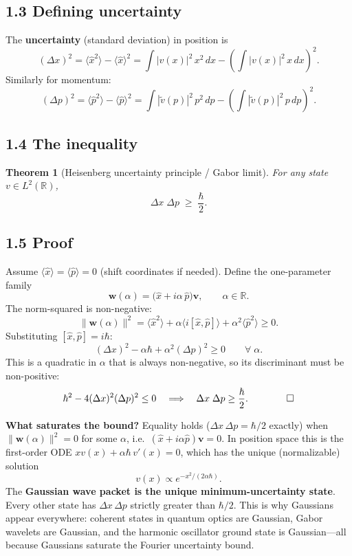 \documentclass[12pt,a4paper]{article}
\newtheorem{theorem}{Theorem}
\begin{document}
\subsection{1.3 Defining uncertainty}
The \textbf{uncertainty} (standard deviation) in position is
\[
    (\Delta x)^2 = \langle \hat{x}^2 \rangle - \langle \hat{x} \rangle^2 = \int |v(x)|^2\,x^2\,dx - \left(\int |v(x)|^2\,x\,dx\right)^2.
\]
Similarly for momentum:
\[
    (\Delta p)^2 = \langle \hat{p}^2 \rangle - \langle \hat{p} \rangle^2 = \int |\tilde{v}(p)|^2\,p^2\,dp - \left(\int |\tilde{v}(p)|^2\,p\,dp\right)^2.
\]

\subsection{1.4 The inequality}

\begin{theorem}[Heisenberg uncertainty principle / Gabor limit]
For any state $v \in L^2(\mathbb{R})$,
\[
    \boxed{\Delta x\;\Delta p \;\geq\; \frac{\hbar}{2}.}
\]
\end{theorem}

\subsection{1.5 Proof}
Assume $\langle \hat{x} \rangle = \langle \hat{p} \rangle = 0$ (shift coordinates if needed).  Define the one-parameter family
\[
    \mathbf{w}(\alpha) = \bigl(\hat{x} + i\alpha\,\hat{p}\bigr)\mathbf{v}, \qquad \alpha\in\mathbb{R}.
\]
The norm-squared is non-negative:
\[
    \|\mathbf{w}(\alpha)\|^2 = \langle \hat{x}^2 \rangle + \alpha\langle i[\hat{x},\hat{p}] \rangle + \alpha^2\langle \hat{p}^2 \rangle \geq 0.
\]
Substituting $[\hat{x},\hat{p}]=i\hbar$:
\[
    (\Delta x)^2 - \alpha\hbar + \alpha^2(\Delta p)^2 \geq 0 \qquad \forall\;\alpha.
\]
This is a quadratic in $\alpha$ that is always non-negative, so its discriminant must be non-positive:
\[
    \hbar^2 - 4(\Delta x)^2(\Delta p)^2 \leq 0 \quad\Longrightarrow\quad
    \Delta x\;\Delta p \geq \frac{\hbar}{2}.\qquad\qed
\]

\medskip
\noindent\textbf{What saturates the bound?}  Equality holds ($\Delta x\,\Delta p = \hbar/2$ exactly) when $\|\mathbf{w}(\alpha)\|^2 = 0$ for some $\alpha$, i.e.\ $(\hat{x}+i\alpha\hat{p})\mathbf{v}=0$.  In position space this is the first-order ODE $xv(x) + \alpha\hbar\,v'(x) = 0$, which has the unique (normalizable) solution
\[
    v(x) \propto e^{-x^2/(2\alpha\hbar)}.
\]
The \textbf{Gaussian wave packet is the unique minimum-uncertainty state}.  Every other state has $\Delta x\,\Delta p$ strictly greater than $\hbar/2$.  This is why Gaussians appear everywhere: coherent states in quantum optics are Gaussian, Gabor wavelets are Gaussian, and the harmonic oscillator ground state is Gaussian---all because Gaussians saturate the Fourier uncertainty bound.
\end{document}
